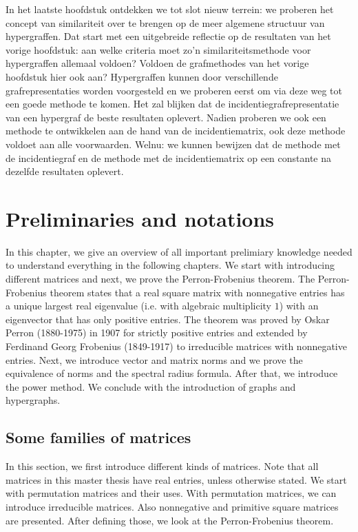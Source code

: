 \documentclass[a4paper,11pt]{report}
\begin{document}
In het laatste hoofdstuk ontdekken we tot slot nieuw terrein: we proberen 
het concept van similariteit over te brengen op de meer algemene 
structuur van hypergraffen. Dat start met een uitgebreide reflectie op de resultaten van het vorige hoofdstuk:
aan welke criteria moet zo'n similariteitsmethode voor hypergraffen allemaal voldoen? Voldoen de grafmethodes van het vorige
hoofdstuk hier ook aan? Hypergraffen kunnen door verschillende 
grafrepresentaties worden voorgesteld en we proberen eerst om via deze 
weg tot een goede methode te komen. Het zal blijken dat de incidentiegrafrepresentatie van een hypergraf de beste
resultaten oplevert. Nadien proberen 
we ook een methode te ontwikkelen aan de hand van de incidentiematrix, ook deze 
methode voldoet aan alle voorwaarden. Welnu: we kunnen bewijzen dat de methode 
met de incidentiegraf en de methode met de incidentiematrix op een constante na 
dezelfde resultaten oplevert.


 

\tableofcontents
\newpage
\chapter{Preliminaries and notations}


In this chapter, we give an overview of all important prelimiary knowledge 
needed to understand everything in the following chapters. We start with 
introducing different matrices and next, we prove the Perron-Frobenius theorem. 
The Perron-Frobenius theorem states that a real square matrix with nonnegative entries has a unique largest real eigenvalue (i.e. with algebraic multiplicity $1$) with an eigenvector 
that has only positive entries. The theorem was proved by Oskar 
Perron (1880-1975) in 1907 for strictly positive entries and extended by 
Ferdinand Georg Frobenius (1849-1917) to irreducible matrices with nonnegative 
entries. Next, we introduce vector and matrix norms and we prove the equivalence 
of norms and the spectral radius formula. After that, we introduce the power 
method. We conclude with the introduction of graphs and hypergraphs.

\section{Some families of matrices}
In this section, we first introduce different kinds of matrices. Note that all matrices in this master thesis have real entries,
unless otherwise stated. We start with permutation matrices and their uses. 
With permutation matrices, we can introduce irreducible matrices. Also nonnegative and primitive square matrices are presented. After defining 
those, we look at the Perron-Frobenius theorem. 
\end{document}
